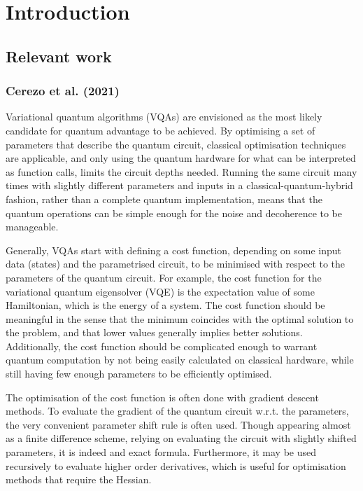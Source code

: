 \chapter{Introduction}

\section{Relevant work}


\subsection{Cerezo et al. (2021)}
Variational quantum algorithms (VQAs) are envisioned as the most likely candidate for quantum advantage to be achieved. By optimising a set of parameters that describe the quantum circuit, classical optimisation techniques are applicable, and only using the quantum hardware for what can be interpreted as function calls, limits the circuit depths needed. Running the same circuit many times with slightly different parameters and inputs in a classical-quantum-hybrid fashion, rather than a complete quantum implementation, means that the quantum operations can be simple enough for the noise and decoherence to be manageable.

Generally, VQAs start with defining a cost function, depending on some input data (states) and the parametrised circuit, to be minimised with respect to the parameters of the quantum circuit. For example, the cost function for the variational quantum eigensolver (VQE) is the expectation value of some Hamiltonian, which is the energy of a system. The cost function should be meaningful in the sense that the minimum coincides with the optimal solution to the problem, and that lower values generally implies better solutions. Additionally, the cost function should be complicated enough to warrant quantum computation by not being easily calculated on classical hardware, while still having few enough parameters to be efficiently optimised.

The optimisation of the cost function is often done with gradient descent methods. To evaluate the gradient of the quantum circuit w.r.t. the parameters, the very convenient parameter shift rule is often used. Though appearing almost as a finite difference scheme, relying on evaluating the circuit with slightly shifted parameters, it is indeed and exact formula. Furthermore, it may be used recursively to evaluate higher order derivatives, which is useful for optimisation methods that require the Hessian.

